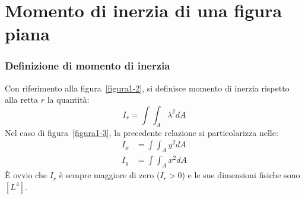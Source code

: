 \part{Momento di inerzia di una figura piana}
\setcounter{section}{0}
\section{Definizione di momento di inerzia}
Con riferimento alla figura~\vref{figura1-2}, si definisce momento di inerzia rispetto alla retta $r$ la quantità:
\begin{equation} \label{equazione2-1}
I_r = \int\int_A \lambda^2dA \tag{2.1}
\end{equation}
Nel caso di figura~\ref{figura1-3}, la precedente relazione si particolarizza nelle:
\begin{align}
I_x &= \int\int_A y^{2}dA \tag{2.2a} \label{equazione2-2a} \\ 
I_y &= \int\int_A x^{2}dA \tag{2.2b} \label{equazione2-2b}
\end{align}
È ovvio che $I_r$ è sempre maggiore di zero ($I_r>0$) e le sue dimensioni fisiche sono $[L^4]$.
